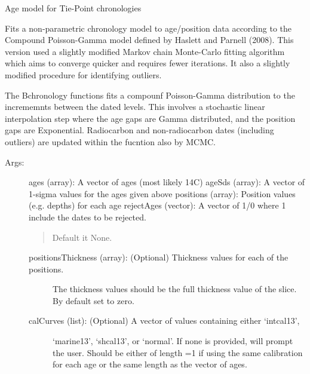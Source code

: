 \documentclass[letterpaper,10pt,english]{sphinxmanual}
\begin{document}

\begin{fulllineitems}
\label{\detokenize{RBchron:pyleoclim.RBchron.runBchron}}
Age model for Tie-Point chronologies

Fits a non-parametric chronology model to age/position data according to
the Compound Poisson-Gamma model defined by Haslett and Parnell (2008). 
This version used a slightly modified Markov chain Monte-Carlo fitting
algorithm which aims to converge quicker and requires fewer iterations.
It also a slightly modified procedure for identifying outliers.

The Bchronology functions fits a compounf Poisson-Gamma distribution to the
incrememnts between the dated levels. This involves a stochastic linear
interpolation step where the age gaps are Gamma distributed, and the position
gaps are Exponential. Radiocarbon and non-radiocarbon dates (including outliers)
are updated within the fucntion also by MCMC.
\begin{description}
\item[{Args:}] \leavevmode
ages (array): A vector of ages (most likely 14C)
ageSds (array): A vector of 1-sigma values for the ages given above
positions (array): Position values (e.g. depths) for each age
rejectAges (vector): A vector of 1/0 where 1 include the dates to be rejected.
\begin{quote}

Default it None.
\end{quote}
\begin{description}
\item[{positionsThickness (array): (Optional) Thickness values for each of the positions.}] \leavevmode
The thickness values should be the full thickness value of the
slice. By default set to zero.

\item[{calCurves (list): (Optional) A vector of values containing either ‘intcal13’,}] \leavevmode
‘marine13’, ‘shcal13’, or ‘normal’. If none is provided, will
prompt the user. Should be either of length =1 if using the same
calibration for each age or the same length as the vector of ages.


\end{description}
\end{description}
\end{fulllineitems}
\end{document}
